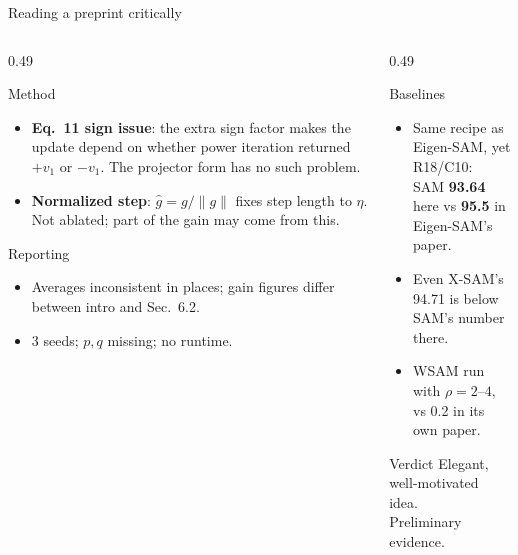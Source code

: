 \documentclass[aspectratio=169,10pt]{beamer}
\newcommand{\norm}[1]{\lVert #1\rVert}
\begin{document}
\begin{frame}{Reading a preprint critically}
\begin{columns}[T]
\begin{column}{0.49\textwidth}
\begin{alertblock}{Method}
\begin{itemize}\small
  \item \textbf{Eq.\ 11 sign issue}: the extra sign factor makes the update depend on whether power iteration returned $+v_1$ or $-v_1$. The projector form has no such problem.
  \item \textbf{Normalized step}: $\hat g=g/\norm g$ fixes step length to $\eta$. Not ablated; part of the gain may come from this.
\end{itemize}
\end{alertblock}
\begin{alertblock}{Reporting}
\begin{itemize}\small
  \item Averages inconsistent in places; gain figures differ between intro and Sec.\ 6.2.
  \item 3 seeds; $p,q$ missing; no runtime.
\end{itemize}
\end{alertblock}
\end{column}
\begin{column}{0.49\textwidth}
\begin{alertblock}{Baselines}
\begin{itemize}\small
  \item Same recipe as Eigen-SAM, yet R18/C10:\\
  SAM \textbf{93.64} here vs \textbf{95.5} in Eigen-SAM's paper.
  \item Even X-SAM's 94.71 is below SAM's number there.
  \item WSAM run with $\rho=2$--$4$, vs 0.2 in its own paper.
\end{itemize}
\end{alertblock}
\vspace{0.4em}
\begin{exampleblock}{Verdict}
\centering Elegant, well-motivated idea.\\ Preliminary evidence.
\end{exampleblock}
\end{column}
\end{columns}
\end{frame}
\end{document}
